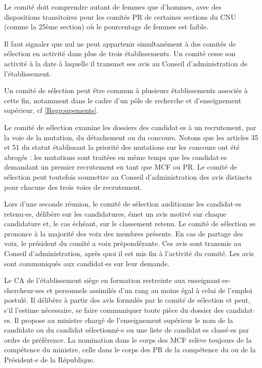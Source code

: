 Le comit\'e doit comprendre autant de femmes que d’hommes, avec des dispositions transitoires pour les comités PR de certaines sections du CNU 
(comme la 25\`eme section) o\`u le pourcentage de femmes est faible.

Il faut signaler que nul ne peut appartenir simultan\'ement \`a des comit\'es de s\'election en activit\'e dans plus de trois
\'etablissements. Un comit\'e cesse son activit\'e \`a la date \`a laquelle il transmet ses avis au Conseil d'administration
de l'\'etablissement.

Un comit\'e de s\'election peut \^etre commun \`a plusieurs \'etablissements associ\'es \`a cette fin, notamment dans le
cadre d'un p\^ole de recherche et d'enseignement sup\'erieur, cf \ref{Regroupements}.

Le comit\'e de s\'election examine les dossiers des candidat$\cdot$es \`a un recrutement, par la voie de la mutation, du
d\'etachement ou du concours. Notons que les articles 35 et 51 du statut \'etablissant la priorit\'e des mutations sur les concours ont \'et\'e abrog\'es : les mutations sont trait\'ees en m\^eme temps que les candidat$\cdot$es demandant un premier recrutement en tant que MCF ou PR.
Le comit\'e de s\'election peut toutefois soumettre au Conseil d'administration des avis distincts pour chacune des trois voies de recrutement.

Lors d'une seconde r\'eunion, le comit\'e de s\'election auditionne les candidat$\cdot$es retenu$\cdot$es, d\'elib\`ere sur les candidatures, \'emet un avis motiv\'e sur chaque candidature et, le cas \'ech\'eant, sur le classement retenu. Le comit\'e de s\'election se prononce \`a la majorit\'e des voix des membres pr\'esents. En cas de partage des voix, le pr\'esident du comit\'e a voix pr\'epond\'erante. Ces avis sont transmis au Conseil
d'administration, apr\`es quoi il est mis fin \`a l'activit\'e du comit\'e. Les avis sont communiqu\'es aux candidat$\cdot$es sur leur demande. 

Le CA de l'\'etablissement si\`ege en formation
restreinte aux enseignant$\cdot$es-chercheur$\cdot$ses et personnels assimil\'es d'un rang au moins \'egal \`a celui de l'emploi
postul\'e. Il d\'elib\`ere \`a partir des avis formul\'es par le comit\'e de s\'election et peut, s'il l'estime n\'ecessaire, se faire communiquer toute pi\`ece du dossier des candidat$\cdot$es. Il propose au ministre charg\'e de l'enseignement sup\'erieur le nom de la candidate ou du candidat s\'electionn\'e$\cdot$e ou une liste de candidat$\cdot$es class\'e$\cdot$es par ordre de pr\'ef\'erence. La nomination dans le corps des MCF rel\`eve toujours de la comp\'etence du ministre, celle dans le corps des PR de la comp\'etence du ou de la Pr\'esident$\cdot$e de la R\'epublique.

